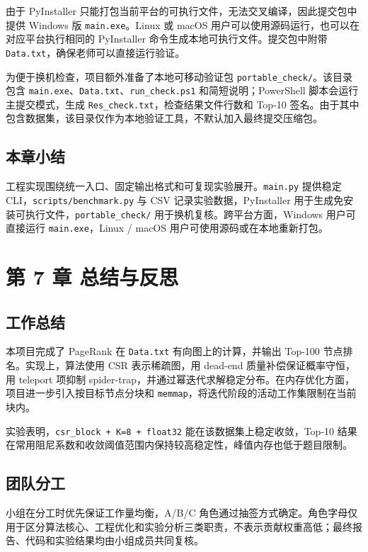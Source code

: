 \documentclass[UTF8,a4paper,12pt]{ctexart}
\begin{document}
由于 PyInstaller 只能打包当前平台的可执行文件，无法交叉编译，因此提交包中提供 Windows 版 \texttt{main.exe}。Linux 或 macOS 用户可以使用源码运行，也可以在对应平台执行相同的 PyInstaller 命令生成本地可执行文件。提交包中附带 \texttt{Data.txt}，确保老师可以直接运行验证。

为便于换机检查，项目额外准备了本地可移动验证包 \texttt{portable\_check/}。该目录包含 \texttt{main.exe}、\texttt{Data.txt}、\texttt{run\_check.ps1} 和简短说明；PowerShell 脚本会运行主提交模式，生成 \texttt{Res\_check.txt}，检查结果文件行数和 Top-10 签名。由于其中包含数据集，该目录仅作为本地验证工具，不默认加入最终提交压缩包。

\subsection{本章小结}

工程实现围绕统一入口、固定输出格式和可复现实验展开。\texttt{main.py} 提供稳定 CLI，\texttt{scripts/benchmark.py} 与 CSV 记录实验数据，PyInstaller 用于生成免安装可执行文件，\texttt{portable\_check/} 用于换机复核。跨平台方面，Windows 用户可直接运行 \texttt{main.exe}，Linux / macOS 用户可使用源码或在本地重新打包。


\section{第 7 章 总结与反思}

\subsection{工作总结}

本项目完成了 PageRank 在 \texttt{Data.txt} 有向图上的计算，并输出 Top-100 节点排名。实现上，算法使用 CSR 表示稀疏图，用 dead-end 质量补偿保证概率守恒，用 teleport 项抑制 spider-trap，并通过幂迭代求解稳定分布。在内存优化方面，项目进一步引入按目标节点分块和 \texttt{memmap}，将迭代阶段的活动工作集限制在当前块内。

实验表明，\texttt{csr\_block + K=8 + float32} 能在该数据集上稳定收敛，Top-10 结果在常用阻尼系数和收敛阈值范围内保持较高稳定性，峰值内存也低于题目限制。

\subsection{团队分工}

小组在分工时优先保证工作量均衡，A/B/C 角色通过抽签方式确定。角色字母仅用于区分算法核心、工程优化和实验分析三类职责，不表示贡献权重高低；最终报告、代码和实验结果均由小组成员共同复核。
\end{document}
